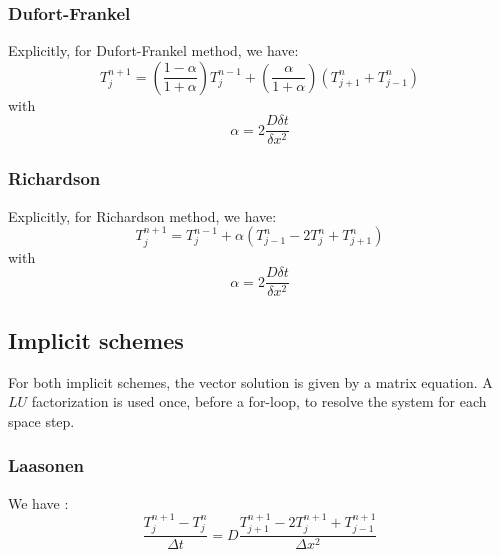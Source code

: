 \documentclass{article}
\begin{document}
            \subsubsection{Dufort-Frankel}
                Explicitly, for Dufort-Frankel method, we have:
                \begin{equation}
                    T_{j}^{n+1} = (\frac{1-\alpha}{1+\alpha})T_{j}^{n-1} + (\frac{\alpha}{1+\alpha})(T_{j+1}^{n}+T_{j-1}^{n})
                \end{equation}
                with $$\alpha = 2\frac{D\delta t}{\delta x^{2}}$$

            \subsubsection{Richardson}
                Explicitly, for Richardson method, we have:
                \begin{equation}
                    T_{j}^{n+1} = T_{j}^{n-1} + \alpha (T_{j-1}^{n} - 2T_{j}^{n} + T_{j+1}^{n})
                \end{equation}
                with $$\alpha = 2\frac{D\delta t}{\delta x^{2}}$$

        \subsection{Implicit schemes}

                For both implicit schemes, the vector solution is given by a matrix equation. A $LU$
                factorization is used once, before a for-loop, to resolve the system for each space step.

                \subsubsection{Laasonen}

                We have :
                \begin{equation}
                    \frac{T_{j}^{n+1} - T_{j}^n}{\Delta t} = D \frac{T_{j+1}^{n+1}- 2T_{j}^{n+1} + T_{j-1}^{n+1}}{\Delta x^2}
                \end{equation}
\end{document}
